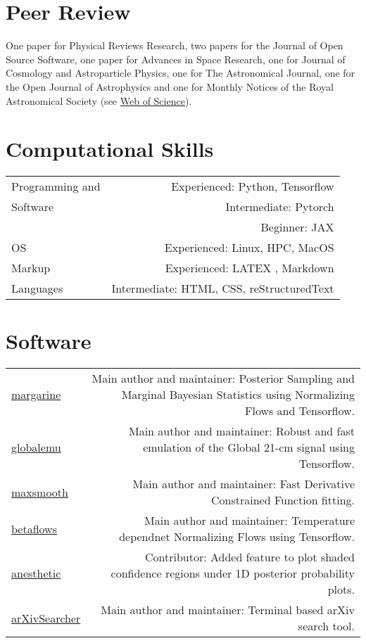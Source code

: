 \documentclass{article}
\begin{document}
\section*{Peer Review}
One paper for Physical Reviews Research, two papers for the Journal of Open Source Software, one paper for Advances in Space Research, one for Journal of Cosmology and Astroparticle Physics, one for The Astronomical Journal, one for the Open Journal of Astrophysics and one for Monthly Notices of the Royal Astronomical Society (see \href{https://www.webofscience.com/wos/author/record/3920858}{Web of Science}).

\section*{Computational Skills}

\begin{tabular}{L!{\vrule}R}
	Programming and & Experienced: Python, Tensorflow \\
    Software & Intermediate: Pytorch \\
    & Beginner: JAX \\
    OS & Experienced: Linux, HPC, MacOS \\
	Markup & Experienced: LATEX , Markdown\\
	Languages & Intermediate: HTML, CSS, reStructuredText
\end{tabular}

\section*{Software}

\begin{tabular}{L!{\vrule}R}
	\href{https://github.com/htjb/margarine}{margarine} & Main author and maintainer: Posterior Sampling and Marginal Bayesian Statistics using Normalizing Flows and Tensorflow. \\
	\href{https://github.com/htjb/globalemu}{globalemu} & Main author and maintainer: Robust and fast emulation of the Global 21-cm signal using Tensorflow. \\
	\href{https://github.com/htjb/maxsmooth}{maxsmooth} & Main author and maintainer: Fast Derivative Constrained Function fitting.\\
     \href{https://github.com/htjb/beta-flows}{betaflows} & Main author and maintainer: Temperature dependnet Normalizing Flows using Tensorflow. \\
	\href{https://github.com/williamjameshandley/anesthetic}{anesthetic} & Contributor: Added feature to plot shaded confidence regions under 1D posterior probability plots.\\
	\href{https://github.com/htjb/arXivSearcher}{arXivSearcher} & Main author and maintainer: Terminal based arXiv search tool.
\end{tabular}
\end{document}
